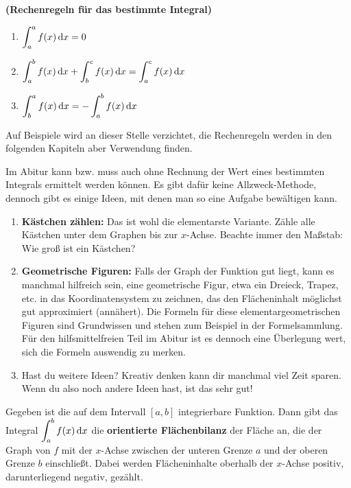 \documentclass[ngerman, 12pt]{nssheetxea}
\begin{document}
\begin{theorem} \textbf{(Rechenregeln für das bestimmte Integral)} \par
\begin{enumerate}
\item $ \displaystyle \int_a^a f(x) \mathop{}\!\mathrm{d} x = 0 $  
\item $\displaystyle \int_a^b f(x) \mathop{}\!\mathrm{d} x + \int_b^c f(x) \mathop{}\!\mathrm{d} x= \int_a^c f(x) \mathop{}\!\mathrm{d} x $
\item $\displaystyle \int_b^a f(x) \mathop{}\!\mathrm{d} x = -\int_a^b f(x) \mathop{}\!\mathrm{d} x$
\end{enumerate}
\label{Satz:Rechenregeln_besIntegral}
\end{theorem}
Auf Beispiele wird an dieser Stelle verzichtet, die Rechenregeln werden in den folgenden Kapiteln aber Verwendung finden. \par
Im Abitur kann bzw. muss auch ohne Rechnung der Wert eines bestimmten Integrals ermittelt werden können. Es gibt dafür keine Allzweck-Methode, dennoch gibt es einige Ideen, mit denen man so eine Aufgabe bewältigen kann. 
\begin{enumerate}
\item \textbf{Kästchen zählen:} Das ist wohl die elementarste Variante. Zähle alle Kästchen unter dem Graphen bis zur $x$-Achse. Beachte immer den Maßstab: Wie groß ist ein Kästchen?
\item  \textbf{Geometrische Figuren:} Falls der Graph der Funktion gut liegt, kann es manchmal hilfreich sein, eine geometrische Figur, etwa ein Dreieck, Trapez, etc. in das Koordinatensystem zu zeichnen, das den Flächeninhalt möglichst gut approximiert (annähert). Die Formeln für diese elementargeometrischen Figuren sind Grundwissen und stehen zum Beispiel in der Formelsammlung. Für den hilfsmittelfreien Teil im Abitur ist es dennoch eine Überlegung wert, sich die Formeln auswendig zu merken.
\item Hast du weitere Ideen? Kreativ denken kann dir manchmal viel Zeit sparen. Wenn du also noch andere Ideen hast, ist das sehr gut!
\end{enumerate}

\begin{theorem}
Gegeben ist die auf dem Intervall $[a,b]$ integrierbare Funktion. Dann gibt das Integral $\displaystyle \int_a^b f(x) \mathop{}\!\mathrm{d} x$ die \textbf{orientierte Flächenbilanz} der Fläche an, die der Graph von $f$ mit der $x$-Achse zwischen der unteren Grenze $a$ und der oberen Grenze $b$ einschließt. Dabei werden Flächeninhalte oberhalb der $x$-Achse positiv, darunterliegend negativ, gezählt.
\end{theorem}


\newpage
\renewcommand{\indexname}{Stichwortverzeichnis}


\printindex
\end{document}

